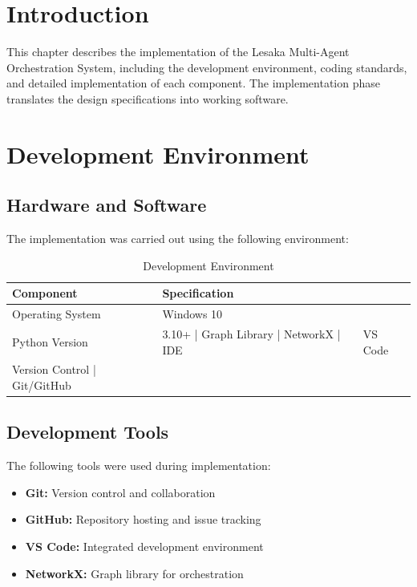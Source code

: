 
\section{Introduction}

This chapter describes the implementation of the Lesaka Multi-Agent Orchestration System, including the development environment, coding standards, and detailed implementation of each component. The implementation phase translates the design specifications into working software.

\section{Development Environment}

\subsection{Hardware and Software}

The implementation was carried out using the following environment:

\begin{table}[H]
\centering
\begin{tabular}{|l|l|}
\hline
\textbf{Component} & \textbf{Specification} \\
\hline
Operating System & Windows 10 \\
Python Version & 3.10+ |
Graph Library | NetworkX |
IDE & VS Code \\
Version Control | Git/GitHub \\
\end{tabular}
\caption{Development Environment}
\end{table}

\subsection{Development Tools}

The following tools were used during implementation:

\begin{itemize}
    \item \textbf{Git:} Version control and collaboration
    \item \textbf{GitHub:} Repository hosting and issue tracking
    \item \textbf{VS Code:} Integrated development environment
    \item \textbf{NetworkX:} Graph library for orchestration
\end{itemize}

